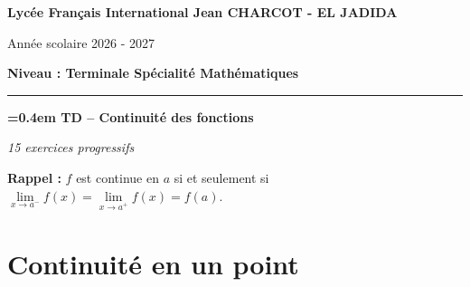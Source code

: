 \documentclass[11pt,a4paper]{article}
\newcommand{\limg}[2]{\lim\limits_{x\to #1^-}#2}
\newcommand{\limd}[2]{\lim\limits_{x\to #1^+}#2}
\begin{document}

\thispagestyle{fancy}
\begin{tcolorbox}[enhanced, colback=white, colframe=bleu, boxrule=1.2pt,
  arc=3mm, left=5mm, right=5mm, top=3mm, bottom=3mm, halign=center]
{\large\bfseries\color{bleu} Lycée Français International Jean CHARCOT - EL JADIDA\par}
\vspace{1mm}
{Année scolaire 2026 - 2027\par}
{\bfseries Niveau : Terminale Spécialité Mathématiques\par}
\vspace{2mm}
{\color{bleu}\rule{0.7\linewidth}{0.8pt}\par}
\vspace{2mm}
{\fontsize{24}{30}\selectfont\bfseries\color{bleu}\spaceskip=0.4em
 TD -- Continuité des fonctions\par}
\vspace{1mm}
{\itshape 15 exercices progressifs\par}
\end{tcolorbox}

\begin{tcolorbox}[enhanced, colback=orangeclair, colframe=orange, boxrule=0.6pt,
  arc=2mm, left=4mm, right=4mm, top=2mm, bottom=2mm]
\textbf{Rappel :} $f$ est continue en $a$ si et seulement si
$\limg{a}{f(x)}=\limd{a}{f(x)}=f(a)$.
\end{tcolorbox}

\section{Continuité en un point}
\end{document}
